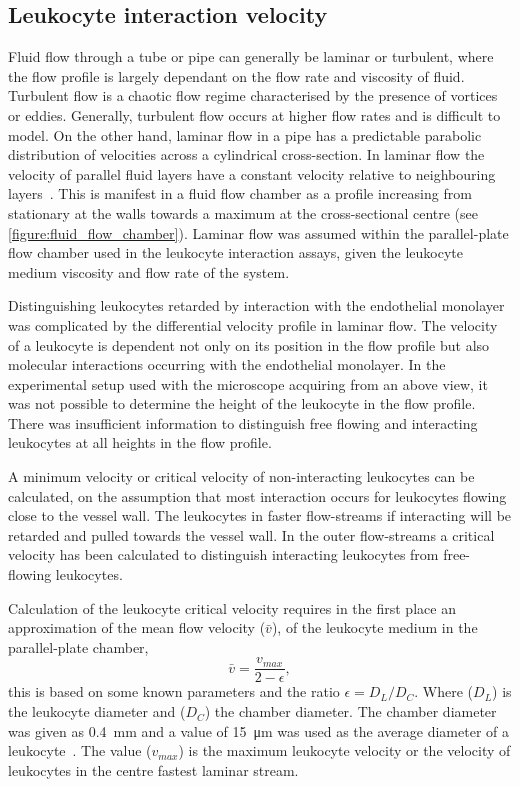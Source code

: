 \subsection{Leukocyte interaction velocity}
\label{leukocytes:introduction:velocity}
Fluid flow through a tube or pipe can generally be laminar or turbulent, where the flow profile is largely dependant on the flow rate and viscosity of fluid. Turbulent flow is a chaotic flow regime characterised by the presence of vortices or eddies. Generally, turbulent flow occurs at higher flow rates and is difficult to model. On the other hand, laminar flow in a pipe has a predictable parabolic distribution of velocities across a cylindrical cross-section. In laminar flow the velocity of parallel fluid layers have a constant velocity relative to neighbouring layers~\cite{Munson2013}. This is manifest in a fluid flow chamber as a profile increasing from stationary at the walls towards a maximum at the cross-sectional centre (see \autoref{figure:fluid_flow_chamber}). Laminar flow was assumed within the parallel-plate flow chamber used in the leukocyte interaction assays, given the leukocyte medium viscosity and flow rate of the system.

Distinguishing leukocytes retarded by interaction with the endothelial monolayer was complicated by the differential velocity profile in laminar flow. The velocity of a leukocyte is dependent not only on its position in the flow profile but also molecular interactions occurring with the endothelial monolayer. In the experimental setup used with the microscope acquiring from an above view, it was not possible to determine the height of the leukocyte in the flow profile. There was insufficient information to distinguish free flowing and interacting leukocytes at all heights in the flow profile. 

A minimum velocity or critical velocity of non-interacting leukocytes can be calculated, on the assumption that most interaction occurs for leukocytes flowing close to the vessel wall. The leukocytes in faster flow-streams if interacting will be retarded and pulled towards the vessel wall. In the outer flow-streams a critical velocity has been calculated to distinguish interacting leukocytes from free-flowing leukocytes.

Calculation of the leukocyte critical velocity requires in the first place an approximation of the mean flow velocity ($\bar{v}$), of the leukocyte medium in the parallel-plate chamber,
\begin{equation}
	\bar{v}=\frac{v_{max}}{2-\epsilon},
\end{equation}
this is based on some known parameters and the ratio $\epsilon = D_L/D_C$. Where ($D_L$) is the leukocyte diameter and ($D_C$) the chamber diameter. The chamber diameter was given as \SI{0.4}{\milli\meter} and a value of \SI{15}{\micro\meter} was used as the average diameter of a leukocyte~\cite{Dorgan1998}. The value ($v_{max}$) is the maximum leukocyte velocity or the velocity of leukocytes in the centre fastest laminar stream.

